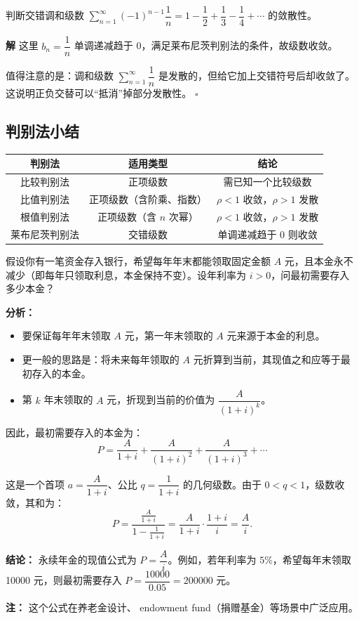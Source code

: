\documentclass[fontset=fandol]{ctexart}
\newenvironment{solution}{\par\noindent\textbf{解}\quad}{\hfill$\square$\par\vspace{0.8em}}
\begin{document}
\begin{example}
判断交错调和级数 \(\sum\limits_{n=1}^{\infty} (-1)^{n-1} \dfrac{1}{n} = 1 - \dfrac12 + \dfrac13 - \dfrac14 + \cdots\) 的敛散性。
\end{example}
\begin{solution}
这里 \(b_n = \dfrac{1}{n}\) 单调递减趋于 0，满足莱布尼茨判别法的条件，故级数收敛。

值得注意的是：调和级数 \(\sum \limits_{n=1}^{\infty}\dfrac{1}{n}\) 是发散的，但给它加上交错符号后却收敛了。这说明正负交替可以“抵消”掉部分发散性。
\end{solution}


\subsection*{判别法小结}

\begin{tabular}{|c|c|c|}
\hline
\textbf{判别法} & \textbf{适用类型} & \textbf{结论} \\
\hline
比较判别法 & 正项级数 & 需已知一个比较级数 \\
\hline
比值判别法 & 正项级数（含阶乘、指数） & \(\rho < 1\) 收敛，\(\rho > 1\) 发散 \\
\hline
根值判别法 & 正项级数（含 \(n\) 次幂） & \(\rho < 1\) 收敛，\(\rho > 1\) 发散 \\
\hline
莱布尼茨判别法 & 交错级数 & 单调递减趋于 0 则收敛 \\
\hline
\end{tabular}



\begin{application}

假设你有一笔资金存入银行，希望每年年末都能领取固定金额 \(A\) 元，且本金永不减少（即每年只领取利息，本金保持不变）。设年利率为 \(i>0\)，问最初需要存入多少本金？

\textbf{分析：}
\begin{itemize}
\item 要保证每年年末领取 \(A\) 元，第一年末领取的 \(A\) 元来源于本金的利息。
\item 更一般的思路是：将未来每年领取的 \(A\) 元折算到当前，其现值之和应等于最初存入的本金。
\item 第 \(k\) 年末领取的 \(A\) 元，折现到当前的价值为 \(\dfrac{A}{(1+i)^k}\)。
\end{itemize}

因此，最初需要存入的本金为：
\[
P = \frac{A}{1+i} + \frac{A}{(1+i)^2} + \frac{A}{(1+i)^3} + \cdots
\]

这是一个首项 \(a=\dfrac{A}{1+i}\)、公比 \(q=\dfrac{1}{1+i}\) 的几何级数。由于 \(0<q<1\)，级数收敛，其和为：
\[
P=\frac{\frac{A}{1+i}}{1-\frac{1}{1+i}}
=\frac{A}{1+i}\cdot\frac{1+i}{i}
=\frac{A}{i}.
\]

\textbf{结论：} 永续年金的现值公式为 \(P=\dfrac{A}{i}\)。例如，若年利率为 \(5\%\)，希望每年末领取 10000 元，则最初需要存入 \(P=\dfrac{10000}{0.05}=200000\) 元。

\textbf{注：} 这个公式在养老金设计、 endowment fund（捐赠基金）等场景中广泛应用。
\end{application}
\end{document}
